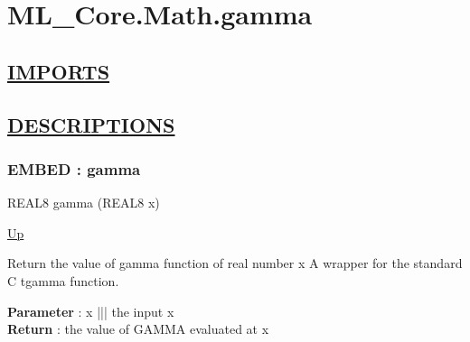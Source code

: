 \chapter*{ML\_Core.Math.gamma}
\hypertarget{ecldoc:toc:ML_Core.Math.gamma}{}

\section*{\underline{IMPORTS}}

\section*{\underline{DESCRIPTIONS}}
\subsection*{EMBED : gamma}
\hypertarget{ecldoc:ml_core.math.gamma}{}
\begin{minipage}[t]{\textwidth}
\begin{flushleft}
REAL8 gamma (REAL8 x)
\end{flushleft}
\end{minipage}
\hyperlink{ecldoc:toc:ML_Core/Math}{Up}

\par
Return the value of gamma function of real number x A wrapper for the standard C tgamma function.
\par
\textbf{Parameter} : x ||| the input x \\
\textbf{Return} : the value of GAMMA evaluated at x \\
